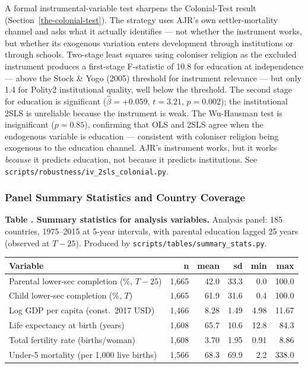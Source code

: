 \documentclass[12pt,letterpaper]{article}
\begin{document}
{A formal instrumental-variable test sharpens the Colonial-Test result
(Section~\ref{the-colonial-test}). The strategy uses AJR's own
settler-mortality channel and asks what it actually identifies --- not
whether the instrument works, but whether its exogenous variation
enters development through institutions or through schools.
Two-stage least squares using coloniser religion as the excluded
instrument produces a first-stage F-statistic of 10.8 for education at
independence --- above the Stock \& Yogo (2005) threshold for
instrument relevance --- but only 1.4 for Polity2 institutional
quality, well below the threshold. The second stage for education is
significant ($\hat\beta = +0.059$, $t = 3.21$, $p = 0.002$); the
institutional 2SLS is unreliable because the instrument is weak. The
Wu-Hausman test is insignificant ($p = 0.85$), confirming that OLS and
2SLS agree when the endogenous variable is education --- consistent
with coloniser religion being exogenous to the education channel.
AJR's instrument works, but it works \emph{because} it predicts
education, not because it predicts institutions.
See \texttt{scripts/robustness/iv\_2sls\_colonial.py}.

\subsubsection{Panel Summary Statistics and Country Coverage}\label{appendix-descriptive}

\label{tab:summary-full}\textbf{Table \thetable. Summary statistics for analysis variables.}
Analysis panel: 185 countries, 1975--2015 at 5-year intervals, with
parental education lagged 25 years (observed at $T{-}25$). Produced by
\texttt{scripts/tables/summary\_stats.py}.

{\small
\begin{longtable}[]{@{}lrrrrr@{}}
\toprule
Variable & n & mean & sd & min & max \\
\midrule
\endhead
Parental lower-sec completion (\%, $T{-}25$) & 1{,}665 & 42.0 & 33.3 &  0.0 & 100.0 \\
Child lower-sec completion (\%, $T$)          & 1{,}665 & 61.9 & 31.6 &  0.4 & 100.0 \\
Log GDP per capita (const.\ 2017 USD)         & 1{,}466 &  8.28 &  1.49 & 4.98 &  11.67 \\
Life expectancy at birth (years)              & 1{,}608 & 65.7 & 10.6 & 12.8 &  84.3 \\
Total fertility rate (births/woman)           & 1{,}608 &  3.70 &  1.95 & 0.91 &   8.86 \\
Under-5 mortality (per 1{,}000 live births)   & 1{,}566 & 68.3 & 69.9 &  2.2 & 338.0 \\
\bottomrule
\end{longtable}
}

}
\end{document}
